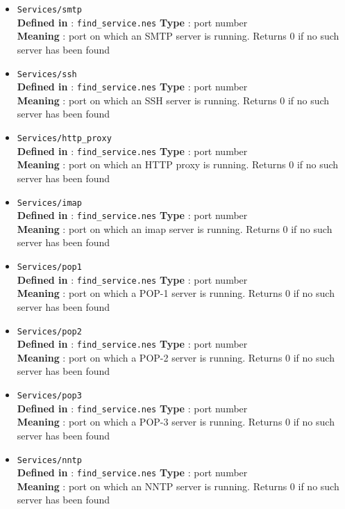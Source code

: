 \documentclass{article}
\begin{document}
\begin{itemize}
\item \verb+Services/smtp+\\
\textbf{Defined in} : \verb+find_service.nes+
\textbf{Type} : port number\\
\textbf{Meaning} : port on which an SMTP server is running. Returns 0 if no
such server has been found

\item \verb+Services/ssh+\\
\textbf{Defined in} : \verb+find_service.nes+
\textbf{Type} : port number\\
\textbf{Meaning} : port on which an SSH server is running. Returns 0 if no
such server has been found

\item \verb+Services/http_proxy+\\
\textbf{Defined in} : \verb+find_service.nes+
\textbf{Type} : port number\\
\textbf{Meaning} : port on which an HTTP proxy is running. Returns 0 if no
such server has been found

\item \verb+Services/imap+\\
\textbf{Defined in} : \verb+find_service.nes+
\textbf{Type} : port number\\
\textbf{Meaning} : port on which an imap server is running. Returns 0 if no
such server has been found

\item \verb+Services/pop1+\\
\textbf{Defined in} : \verb+find_service.nes+
\textbf{Type} : port number\\
\textbf{Meaning} : port on which a POP-1 server is running. Returns 0 if no
such server has been found

\item \verb+Services/pop2+\\
\textbf{Defined in} : \verb+find_service.nes+
\textbf{Type} : port number\\
\textbf{Meaning} : port on which a POP-2 server is running. Returns 0 if no
such server has been found


\item \verb+Services/pop3+\\
\textbf{Defined in} : \verb+find_service.nes+
\textbf{Type} : port number\\
\textbf{Meaning} : port on which a POP-3 server is running. Returns 0 if no
such server has been found

\item \verb+Services/nntp+\\
\textbf{Defined in} : \verb+find_service.nes+
\textbf{Type} : port number\\
\textbf{Meaning} : port on which an NNTP server is running. Returns 0 if no
such server has been found


\end{itemize}
\end{document}
